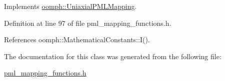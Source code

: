 Implements \hyperlink{classoomph_1_1UniaxialPMLMapping_ae4a0c65e90fe4b90d2ff00b193798588}{oomph\+::\+Uniaxial\+P\+M\+L\+Mapping}.



Definition at line 97 of file pml\+\_\+mapping\+\_\+functions.\+h.



References oomph\+::\+Mathematical\+Constants\+::\+I().



The documentation for this class was generated from the following file\+:\begin{DoxyCompactItemize}
\item 
\hyperlink{pml__mapping__functions_8h}{pml\+\_\+mapping\+\_\+functions.\+h}\end{DoxyCompactItemize}

